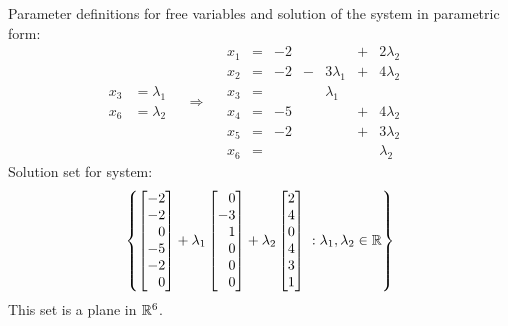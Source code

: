 \documentclass[12pt]{article}
\begin{document}
Parameter definitions for free variables and solution of the system in parametric form:
\[
\begin{aligned}
x_3&=\lambda_1\\
x_6&=\lambda_2
\end{aligned}
\quad\Longrightarrow\quad
\begin{alignedat}{6}
x_1 &{}={}& -2 &&                  &{}+{}& 2\lambda_2&\\
x_2 &{}={}& -2 &{}-{}& 3\lambda_1  &{}+{}& 4\lambda_2\\
x_3 &{}={}&    &&       \lambda_1  &&\\
x_4 &{}={}& -5 &&                  &{}+{}& 4\lambda_2\\
x_5 &{}={}& -2 &&                  &{}+{}& 3\lambda_2\\
x_6 &{}={}&    &&                  &&       \lambda_2
\end{alignedat}
\]
Solution set for system:
\[
\left\{
\begin{bmatrix*}[r]-2\\-2\\0\\-5\\-2\\0\end{bmatrix*}
+\lambda_1\begin{bmatrix*}[r]0\\-3\\1\\0\\0\\0\end{bmatrix*}
+\lambda_2\begin{bmatrix*}[r]2\\4\\0\\4\\3\\1\end{bmatrix*}
\;:\lambda_1,\lambda_2\in\R
\right\}
\]
This set is a plane in $\mathbb{R}^6$.
\end{document}
